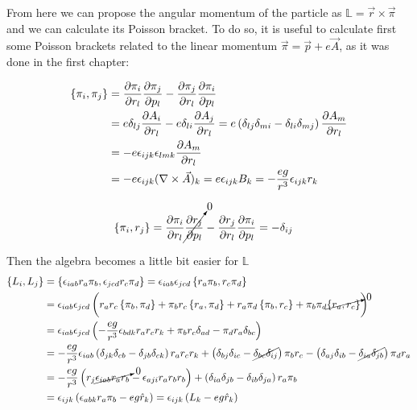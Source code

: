 From here we can propose the angular momentum of the particle as $\mathbb{L}= \vec{r}\times\vec{\pi}$ and we can calculate its Poisson bracket. To do so, it is useful to calculate first some Poisson brackets related to the linear momentum $\vec{\pi} = \vec{p} + e\vec{A}$, as it was done in the first chapter:


\begin{align*}
\left\lbrace \pi_i, \pi_j \right\rbrace &= \frac{\partial \pi_i}{\partial r_l}\frac{\partial \pi_j}{\partial p_l} - \frac{\partial \pi_j}{\partial r_l}\frac{\partial \pi_i}{\partial p_l}\\
&= e\delta_{lj}\frac{\partial A_i}{\partial r_l} -e\delta_{li}\frac{\partial A_j}{\partial r_l}            = e\left( \delta_{lj}\delta_{mi} - \delta_{li}\delta_{mj} \right)\frac{\partial A_m}{\partial r_l} \\
&= -e\epsilon_{ijk}\epsilon_{lmk}\frac{\partial A_m}{\partial r_l}\\
&= -e\epsilon_{ijk}(\nabla \times \vec{A})_k = e\epsilon_{ijk}B_k = -\frac{eg}{r^3}\epsilon_{ijk}r_k
\end{align*}

\begin{align*}
\left\lbrace \pi_i, r_j \right\rbrace &= \frac{\partial \pi_i}{\partial r_l}\cancelto{0}{\frac{\partial r_j}{\partial p_l}} - \frac{\partial r_j}{\partial r_l}\frac{\partial \pi_i}{\partial p_l} =  -\delta_{ij}
\end{align*}

Then the algebra becomes a little bit easier for $\mathbb{L}$
\begin{align*}
\left\lbrace L_i, L_j \right\rbrace &= \left\lbrace \epsilon_{iab}r_a\pi_b, \epsilon_{jcd}r_c\pi_d \right\rbrace = \epsilon_{iab}\epsilon_{jcd}\left\lbrace r_a\pi_b, r_c\pi_d \right\rbrace\\
&= \epsilon_{iab}\epsilon_{jcd}\left( r_ar_c\left\lbrace \pi_b, \pi_d \right\rbrace+\pi_br_c\left\lbrace r_a, \pi_d \right\rbrace            +r_a\pi_d\left\lbrace \pi_b, r_c \right\rbrace + \pi_b\pi_d\cancelto{0}{\left\lbrace r_a, r_c \right\rbrace} \right)\\
&= \epsilon_{iab}\epsilon_{jcd}\left( -\frac{eg}{r^3}\epsilon_{bdk}r_ar_cr_k+\pi_br_c\delta_{ad}-\pi_dr_a\delta_{bc} \right)\\
&= -\frac{eg}{r^3}\epsilon_{iab}\left( \delta_{jk}\delta_{cb} - \delta_{jb}\delta_{ck} \right)r_ar_cr_k + \left( \delta_{bj}\delta_{ic} - \cancel{\delta_{bc}\delta_{ij}} \right)\pi_br_c - \left( \delta_{aj}\delta_{ib} - \cancel{\delta_{ia}\delta_{jb}} \right)\pi_dr_a\\
& = -\frac{eg}{r^3}\left( r_j\cancelto{0}{\epsilon_{iab}r_ar_b}-\epsilon_{aji}r_a{r_br_b} \right)             +\left( \delta_{ia}\delta_{jb}-\delta_{ib}\delta_{ja} \right)r_a\pi_b\\
& = \epsilon_{ijk}\left( \epsilon_{abk}r_a\pi_b-{eg}\hat{r}_k \right) = \epsilon_{ijk}\left( L_k-{eg}\hat{r}_k \right)
\end{align*}

